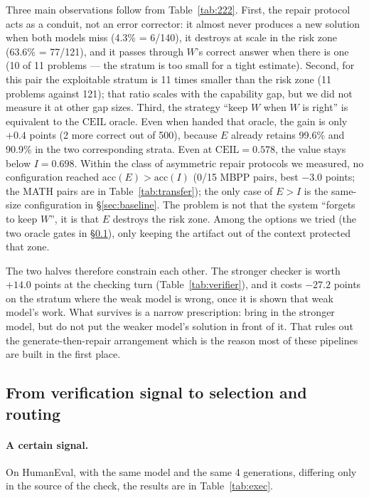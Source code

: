 \documentclass[11pt,a4paper]{article}
\newcommand{\CEIL}{\mathrm{CEIL}}
\newcommand{\acc}{\mathrm{acc}}
\begin{document}
Three main observations follow from Table~\ref{tab:222}. First, the repair protocol acts as a conduit, not an error corrector: it almost never produces a new solution when both models miss (4.3\% = 6/140), it destroys at scale in the risk zone (63.6\% = 77/121), and it passes through $W$'s correct answer when there is one (10 of 11 problems --- the stratum is too small for a tight estimate). Second, for this pair the exploitable stratum is 11 times smaller than the risk zone (11 problems against 121); that ratio scales with the capability gap, but we did not measure it at other gap sizes. Third, the strategy ``keep $W$ when $W$ is right'' is equivalent to the $\CEIL$ oracle. Even when handed that oracle, the gain is only $+0.4$ points (2 more correct out of 500), because $E$ already retains 99.6\% and 90.9\% in the two corresponding strata. Even at $\CEIL = 0.578$, the value stays below $I = 0.698$. Within the class of asymmetric repair protocols we measured, no configuration reached $\acc(E) > \acc(I)$ (0/15 MBPP pairs, best $-3.0$ points; the MATH pairs are in Table~\ref{tab:transfer}); the only case of $E>I$ is the same-size configuration in \S\ref{sec:baseline}. The problem is not that the system ``forgets to keep $W$'', it is that $E$ destroys the risk zone. Among the options we tried (the two oracle gates in \S\ref{sec:kappa}), only keeping the artifact out of the context protected that zone.

The two halves therefore constrain each other. The stronger checker is worth $+14.0$ points at the checking turn (Table~\ref{tab:verifier}), and it costs $-27.2$ points on the stratum where the weak model is wrong, once it is shown that weak model's work. What survives is a narrow prescription: bring in the stronger model, but do not put the weaker model's solution in front of it. That rules out the generate-then-repair arrangement which is the reason most of these pipelines are built in the first place.
\subsection{From verification signal to selection and routing}\label{sec:kappa}

\paragraph{A certain signal.}
On HumanEval, with the same model and the same 4 generations, differing only in the source of the check, the results are in Table~\ref{tab:exec}.
\end{document}
